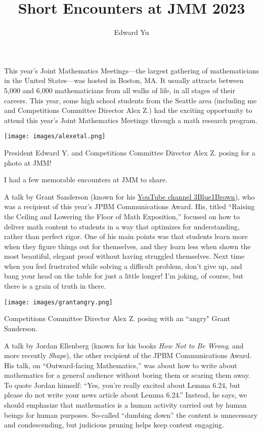 \documentclass{article}
\title{Short Encounters at JMM 2023}
\author{Edward Yu}
\begin{document}
\maketitle
This year’s Joint Mathematics Meetings—the largest gathering of mathematicians in the United States—was hosted in Boston, MA. It usually attracts between 5,000 and 6,000 mathematicians from all walks of life, in all stages of their careers. This year, some high school students from the Seattle area (including me and Competitions Committee Director Alex Z.) had the exciting opportunity to attend this year’s Joint Mathematics Meetings through a math research program.

\begin{center}
    \footnotesize
    \texttt{[image: images/alexetal.png]}
    
    President Edward Y. and Competitions Committee Director Alex Z. posing for a photo at JMM!
\end{center}

I had a few memorable encounters at JMM to share.

A talk by Grant Sanderson (known for his \href{https://www.youtube.com/@3blue1brown}{YouTube channel 3Blue1Brown}), who was a recipient of this year’s JPBM Communications Award. His, titled “Raising the Ceiling and Lowering the Floor of Math Exposition,” focused on how to deliver math content to students in a way that optimizes for understanding, rather than perfect rigor. One of his main points was that students learn more when they figure things out for themselves, and they learn less when shown the most beautiful, elegant proof without having struggled themselves. Next time when you feel frustrated while solving a difficult problem, don’t give up, and bang your head on the table for just a little longer! I’m joking, of course, but there is a grain of truth in there.

\begin{center}
    \footnotesize
    \texttt{[image: images/grantangry.png]}
    
    Competitions Committee Director Alex Z. posing with an ``angry" Grant Sanderson.
\end{center}

A talk by Jordan Ellenberg (known for his books \textit{How Not to Be Wrong}, and more recently \textit{Shape}), the other recipient of the JPBM Communications Award. His talk, on “Outward-facing Mathematics,” was about how to write about mathematics for a general audience without boring them or scaring them away. To quote Jordan himself: “Yes, you’re really excited about Lemma 6.24, but please do not write your news article about Lemma 6.24.” Instead, he says, we should emphasize that mathematics is a human activity carried out by human beings for human purposes. So-called “dumbing down” the content is unnecessary and condescending, but judicious pruning helps keep content engaging.
\end{document}
